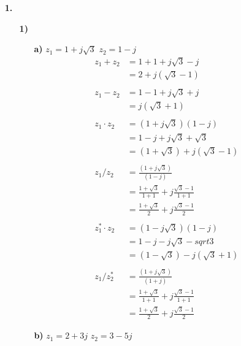 \documentclass[a4paper,11pt]{article}
\author{\authorinfotitle}
\title{\titleinfo}
\date{\today}
\begin{document}
	\maketitle
	\begin{enumerate}
		\item[\textbf{1.}]
		\begin{enumerate}
			\item[\textbf{1)}]
			\begin{enumerate}
			\item[\textbf{a)}] $z_1 = 1+j\sqrt{3}$ $z_2=1-j$
			\begin{align*}
			z_1+z_2 &= 1+1+j\sqrt{3}-j \\
					&= 2+j(\sqrt{3}-1) \\\\
			z_1-z_2 &= 1-1+j\sqrt{3}+j \\
					&= j(\sqrt{3}+1)\\\\
			z_1 \cdot z_2 &= (1+j\sqrt{3})(1-j) \\
			              &= 1-j+j\sqrt{3}+\sqrt{3} \\
			              &= (1+\sqrt{3})+j(\sqrt{3}-1)\\\\
			z_1 / z_2 &= \frac{(1+j\sqrt{3})}{(1-j)} \\
			          &= \frac{1+\sqrt{3}}{1+1}+j\frac{\sqrt{3}-1}{1+1} \\
			          &= \frac{1+\sqrt{3}}{2}+j\frac{\sqrt{3}-1}{2}\\\\
			z_1^* \cdot z_2 &= (1-j\sqrt{3})(1-j) \\
			              &= 1-j-j\sqrt{3}-sqrt{3} \\
			              &= (1-\sqrt{3})-j(\sqrt{3}+1)\\\\
			z_1 / z_2^* &= \frac{(1+j\sqrt{3})}{(1+j)} \\
			            &= \frac{1+\sqrt{3}}{1+1}+j\frac{\sqrt{3}-1}{1+1} \\
			            &= \frac{1+\sqrt{3}}{2}+j\frac{\sqrt{3}-1}{2}
			\end{align*}
			\item[\textbf{b)}] $z_1 = 2+3j$ $z_2=3-5j$
			

\end{enumerate}
\end{enumerate}
\end{enumerate}
\end{document}
